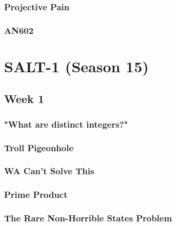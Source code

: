 \documentclass[titlepage=true]{scrartcl}
\begin{document}
	\subsubsection{Projective Pain}
	\label{14-2-6}
	
	\newpage

	\subsubsection{AN602}
	\label{14-2-7}
	
	\newpage

\section{SALT-1 (Season 15)}

    \subsection{Week 1}

    \subsubsection{"What are distinct integers?"}
	\label{15-1-1}
	
	\newpage

	\subsubsection{Troll Pigeonhole}
	\label{15-1-2}
	
	\newpage

    \subsubsection{WA Can't Solve This}
	\label{15-1-3}
	
	\newpage

    \subsubsection{Prime Product}
	\label{15-1-4}
	
	\newpage
	
	\subsubsection{The Rare Non-Horrible States Problem}
	\label{15-1-5}
	
	\newpage
\end{document}
